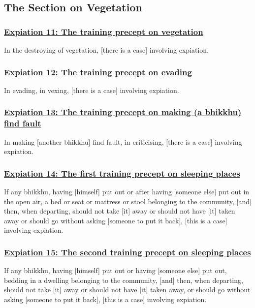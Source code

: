\setsubsecheadstyle{\subsectionFmt}
\subsection{The Section on Vegetation}
\vspace{0.2cm}

\subsubsection*{\hyperref[pac11]{Expiation 11: The training precept on vegetation}}
\label{exp11}
In the destroying of vegetation, [there is a case] involving expiation.

\subsubsection*{\hyperref[pac12]{Expiation 12: The training precept on evading}}
\label{exp12}
In evading, in vexing, [there is a case] involving expiation.

\subsubsection*{\hyperref[pac1]{Expiation 13: The training precept on making (a bhikkhu) find fault}}
\label{exp13}
In making [another bhikkhu] find fault, in criticising, [there is a case] involving expiation.

\subsubsection*{\hyperref[pac14]{Expiation 14: The first training precept on sleeping places}}
\label{exp14}
If any bhikkhu, having [himself] put out or after having [someone else] put out in the open air, a bed or seat or mattress or stool belonging to the community, [and] then, when departing, should not take [it] away or should not have [it] taken away or should go without asking [someone to put it back], [this is a case] involving expiation.

\subsubsection*{\hyperref[pac15]{Expiation 15: The second training precept on sleeping places}}
\label{exp15}
If any bhikkhu, having [himself] put out or having [someone else] put out, bedding in a dwelling belonging to the community, [and] then, when departing, should not take [it] away or should not have [it] taken away, or should go without asking [someone to put it back], [this is a case] involving expiation.

